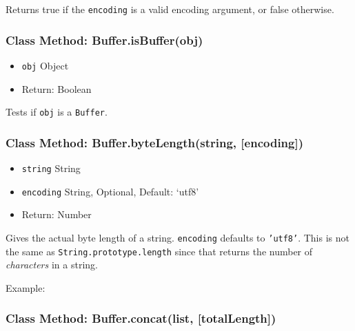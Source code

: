 Returns true if the \texttt{encoding} is a valid encoding argument, or
false otherwise.

\subsubsection{Class Method: Buffer.isBuffer(obj)}

\begin{itemize}
\item
  \texttt{obj} Object
\item
  Return: Boolean
\end{itemize}

Tests if \texttt{obj} is a \texttt{Buffer}.

\subsubsection{Class Method: Buffer.byteLength(string, {[}encoding{]})}

\begin{itemize}
\item
  \texttt{string} String
\item
  \texttt{encoding} String, Optional, Default: `utf8'
\item
  Return: Number
\end{itemize}

Gives the actual byte length of a string. \texttt{encoding} defaults to
\texttt{'utf8'}. This is not the same as
\texttt{String.prototype.length} since that returns the number of
\emph{characters} in a string.

Example:

\begin{Shaded}
\begin{Highlighting}[]
\NormalTok{;}

 \NormalTok{+ } \NormalTok{+ } \NormalTok{+}
  \NormalTok{) + }\NormalTok{);}

\end{Highlighting}
\end{Shaded}

\subsubsection{Class Method: Buffer.concat(list, {[}totalLength{]})}

